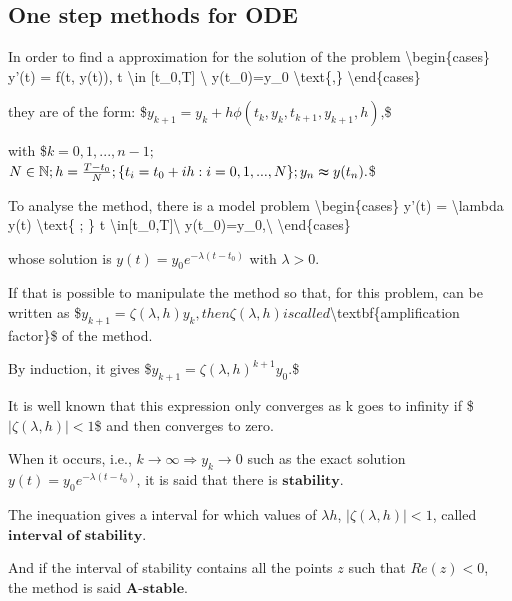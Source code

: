 \documentclass[letterpaper,10pt,english]{jupyterBook}
\begin{document}
\subsection{One step methods for ODE}
\label{\detokenize{cap2:one-step-methods-for-ode}}
\sphinxAtStartPar
In order to find a approximation for the solution of the problem
\textbackslash{}begin\{cases\}
y’(t) = f(t, y(t)), t \textbackslash{}in {[}t\_0,T{]} \textbackslash{}
y(t\_0)=y\_0 \textbackslash{}text\{,\}
\textbackslash{}end\{cases\}

\sphinxAtStartPar
they are of the form:
\$\(
y_{k+1} = y_{k} + h \phi (t_{k},y_{k},t_{k+1},y_{k+1},h) \text{,}
\)\$

\sphinxAtStartPar
with \$\(k = 0, 1, ..., n-1;\)\(
\)\(
N \in \mathbb{N}; h = \frac{T-t_0}{N}; \\
\{t_i = t_0 + ih : i = 0, 1, ..., N\}; \\ 
y_n \thickapprox y(t_n) .
\)\$

\sphinxAtStartPar
To analyse the method, there is a model problem
\textbackslash{}begin\{cases\}
y’(t) = \sphinxhyphen{} \textbackslash{}lambda y(t) \textbackslash{}text\{ ; \} t \textbackslash{}in{[}t\_0,T{]}\textbackslash{}
y(t\_0)=y\_0,\textbackslash{}
\textbackslash{}end\{cases\}

\sphinxAtStartPar
whose solution is \(y(t) = y_0 e^{-\lambda (t-t_0)}\)
with \(\lambda > 0.\)

\sphinxAtStartPar
If that is possible to manipulate the method so that, for this problem, can be written as
\$\(
y_{k+1} = \zeta(\lambda,h) y_k,
\)\(
then \)\(\zeta(\lambda,h)\)\( is called \)\textbackslash{}textbf\{amplification factor\}\$ of the method.

\sphinxAtStartPar
By induction, it gives
\$\(
y_{k+1} = \zeta(\lambda, h)^{k+1} y_0.
\)\$

\sphinxAtStartPar
It is well known that this expression only converges as k goes to infinity if
\$\(
|\zeta(\lambda, h)| < 1
\)\$
and then converges to zero.

\sphinxAtStartPar
When it occurs, i.e., \(k \rightarrow \infty \Rightarrow y_k \rightarrow 0\) such as the exact solution \(y(t) = y_0 e^{-\lambda (t-t_0)}\), it is said that there is \(\textbf{stability}\).

\sphinxAtStartPar
The inequation gives a interval for which values of \(\lambda h\), \(|\zeta(\lambda, h)|<1\), called \(\textbf{interval of stability}\).

\sphinxAtStartPar
And if the interval of stability contains all the points \(z\) such that \(Re(z) < 0\), the method is said \(\textbf{A-stable}\).
\end{document}
